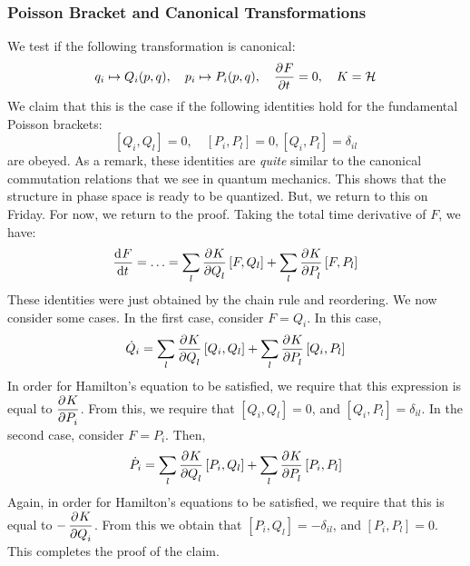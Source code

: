 \documentclass[../PHYS306Notes.tex]{subfiles}
\begin{document}
\subsubsection{Poisson Bracket and Canonical Transformations}
We test if the following transformation is canonical:
\[q_i \mapsto Q_i(p, q), \quad p_i \mapsto P_i(p, q), \quad \dpd{F}{t} = 0, \quad K = \HH\]
We claim that this is the case if the following identities hold for the fundamental Poisson brackets:
\[[Q_i, Q_l] = 0, \quad [P_i, P_l] = 0, [Q_i, P_l] = \delta_{il}\]
are obeyed. As a remark, these identities are \textit{quite} similar to the canonical commutation relations that we see in quantum mechanics. This shows that the structure in phase space is ready to be quantized. But, we return to this on Friday. For now, we return to the proof. Taking the total time derivative of $F$, we have:
\[\dod{F}{t} = \ldots = \sum_l \dpd{K}{Q_l}[F, Q_l] + \sum_l \dpd{K}{P_l}[F, P_l]\]
These identities were just obtained by the chain rule and reordering. We now consider some cases. In the first case, consider $F = Q_i$. In this case,
\[\dot{Q}_i = \sum_l\dpd{K}{Q_l}[Q_i, Q_l] + \sum_l\dpd{K}{P_l}[Q_i, P_l]\]
In order for Hamilton's equation to be satisfied, we require that this expression is equal to $\dpd{K}{P_i}$. From this, we require that $[Q_i, Q_l] = 0$, and $[Q_i, P_l] = \delta_{il}$. In the second case, consider $F =P_i$. Then,
\[\dot{P}_i = \sum_l\dpd{K}{Q_l}[P_i, Q_l] + \sum_l\dpd{K}{P_l}[P_i, P_l]\]
Again, in order for Hamilton's equations to be satisfied, we require that this is equal to $-\dpd{K}{Q_i}$. From this we obtain that $[P_i, Q_l] = -\delta_{il}$, and $[P_i, P_l] = 0$. This completes the proof of the claim. 
\end{document}
